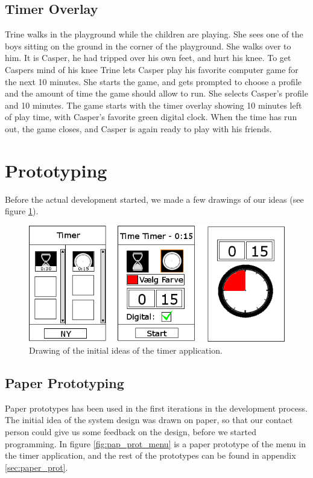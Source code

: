 	\subsection*{Timer Overlay}
	Trine walks in the playground while the children are playing. She sees one of the boys sitting on the ground in the corner of the playground. She walks over to him. It is Casper, he had tripped over his own feet, and hurt his knee. To get Caspers mind of his knee Trine lets Casper play his favorite computer game for the next 10 minutes. She starts the game, and gets prompted to choose a profile and the amount of time the game should allow to run. She selects Casper's profile and 10 minutes. The game starts with the timer overlay showing 10 minutes left of play time, with Casper's favorite green digital clock. When the time has run out, the game closes, and Casper is again ready to play with his friends.

\section{Prototyping}
Before the actual development started, we made a few drawings of our ideas (see figure \ref{fig:init_drawings}).

	\begin{figure}[H]
		\centering
			\includegraphics[width=\textwidth]{Images/paper_prototype/init_drawings.png}
				\caption{Drawing of the initial ideas of the timer application.}
		\label{fig:init_drawings}
	\end{figure}

	\subsection*{Paper Prototyping}
	Paper prototypes\cite{misc:designInterSys} has been used in the first iterations in the development process. The initial idea of the system design was drawn on paper, so that our contact person could give us some feedback on the design, before we started programming. In figure \autoref{fig:pap_prot_menu} is a paper prototype of the menu in the timer application, and the rest of the prototypes can be found in appendix \autoref{sec:paper_prot}.

